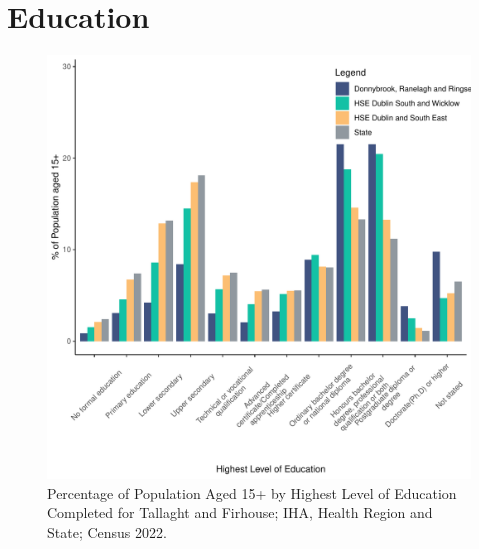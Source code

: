 \documentclass{article}
\begin{document}
\section{Education}\label{sect:Edu}
\begin{figure}[H]
	\centering
	\includegraphics[width = 120mm]{../figures/EduED.pdf}
	\caption{Percentage of Population Aged 15+ by Highest Level of Education Completed for Tallaght and Firhouse; IHA, Health Region and State; Census 2022.}
	\label{fig:vbnv}
	\end{figure}
\end{document}
